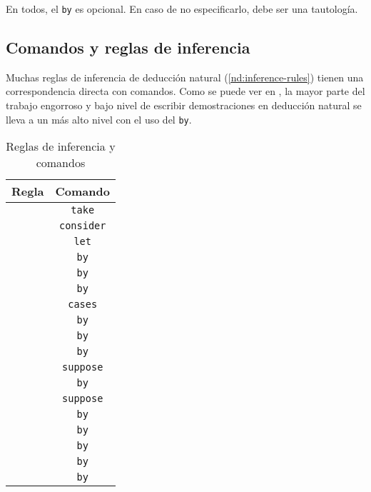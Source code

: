 En todos, el \lstinline{by} es opcional. En caso de no especificarlo, debe ser
una tautología.



\subsection{Comandos y reglas de inferencia}


Muchas reglas de inferencia de deducción natural (\ref{nd:inference-rules})
tienen una correspondencia directa con comandos. Como se puede ver en , la mayor
parte del trabajo engorroso y bajo nivel de escribir demostraciones en deducción
natural se lleva a un más alto nivel con el uso del \lstinline{by}.
\begin{table}[H]
    \centering
    \begin{tabular}{c|c}
    Regla & Comando \\
    \hline
        &   \lstinline|take| \\
        &   \lstinline|consider| \\
        &   \lstinline|let| \\
        &   \lstinline|by| \\
         &   \lstinline|by| \\
         &   \lstinline|by| \\
            &   \lstinline|cases| \\
           &   \lstinline|by| \\
        &   \lstinline|by| \\
        &   \lstinline|by| \\
           &   \lstinline|suppose| \\
           &   \lstinline|by| \\
           &   \lstinline|suppose| \\
           &   \lstinline|by| \\
          &   \lstinline|by| \\
         &   \lstinline|by| \\
            &   \lstinline|by| \\
             &   \lstinline|by|
    \end{tabular}
    \caption{Reglas de inferencia y comandos}
    \label{ppa:tab:inference-rules-to-commands}
\end{table}



